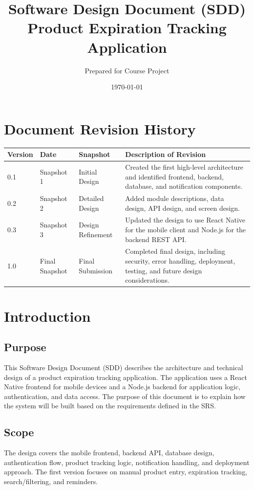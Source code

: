 \documentclass[12pt]{article}
\title{Software Design Document (SDD)\\Product Expiration Tracking Application}
\author{Prepared for Course Project}
\date{\today}
\begin{document}
\maketitle
\newpage
\tableofcontents
\newpage

\section*{Document Revision History}

\begin{longtable}{|p{}|p{}|p{}|p{}|}
\hline
\textbf{Version} & \textbf{Date} & \textbf{Snapshot} & \textbf{Description of Revision} \\
\hline
0.1 & Snapshot 1 & Initial Design & Created the first high-level architecture and identified frontend, backend, database, and notification components. \\
\hline
0.2 & Snapshot 2 & Detailed Design & Added module descriptions, data design, API design, and screen design. \\
\hline
0.3 & Snapshot 3 & Design Refinement & Updated the design to use React Native for the mobile client and Node.js for the backend REST API. \\
\hline
1.0 & Final Snapshot & Final Submission & Completed final design, including security, error handling, deployment, testing, and future design considerations. \\
\hline
\end{longtable}

\section{Introduction}

\subsection{Purpose}
This Software Design Document (SDD) describes the architecture and technical design of a product expiration tracking application. The application uses a React Native frontend for mobile devices and a Node.js backend for application logic, authentication, and data access. The purpose of this document is to explain how the system will be built based on the requirements defined in the SRS.

\subsection{Scope}
The design covers the mobile frontend, backend API, database design, authentication flow, product tracking logic, notification handling, and deployment approach. The first version focuses on manual product entry, expiration tracking, search/filtering, and reminders.
\end{document}
